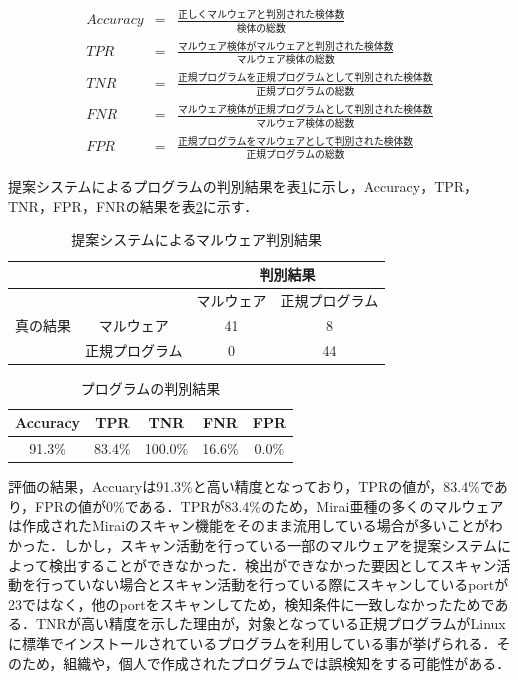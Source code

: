 \begin{eqnarray}
    Accuracy & = & \frac{正しくマルウェアと判別された検体数}{検体の総数}\\
    TPR & = & \frac{マルウェア検体がマルウェアと判別された検体数}{マルウェア検体の総数}\\
    TNR & = & \frac{正規プログラムを正規プログラムとして判別された検体数}{正規プログラムの総数}\\
    FNR & = & \frac{マルウェア検体が正規プログラムとして判別された検体数}{マルウェア検体の総数}\\ 
    FPR & = & \frac{正規プログラムをマルウェアとして判別された検体数}{正規プログラムの総数}
\end{eqnarray}

提案システムによるプログラムの判別結果を表\ref{tab:detect}に示し，Accuracy，TPR，TNR，FPR，FNRの結果を表\ref{tab:result}に示す．

\begin{table}[h]
    \centering
    \caption{提案システムによるマルウェア判別結果}
    \label{tab:detect}
\begin{tabular}[t]{|l|c|c|c|}
    \hline
            &  &  \multicolumn{2}{c|}{判別結果}  \\ \hline 
            &  &  マルウェア & 正規プログラム \\ \hline 
       真の結果 & マルウェア & 41 & 8 \\ \hline
            & 正規プログラム & 0 & 44 \\ \hline
\end{tabular}
\end{table}

\begin{table}[h]
     \caption{プログラムの判別結果} 
     \label{tab:result}
     \centering 
    \begin{tabular}{|c|c|c|c|c|} \hline 
    Accuracy & TPR    & TNR     & FNR    & FPR   \\ \hline
    91.3\%   & 83.4\% & 100.0\% & 16.6\% & 0.0\% \\ \hline
    \end{tabular}
\end{table}

評価の結果，Accuaryは91.3\%と高い精度となっており，TPRの値が，83.4\%であり，FPRの値が0\%である．TPRが83.4\%のため，Mirai亜種の多くのマルウェアは作成されたMiraiのスキャン機能をそのまま流用している場合が多いことがわかった．しかし，スキャン活動を行っている一部のマルウェアを提案システムによって検出することができなかった．検出ができなかった要因としてスキャン活動を行っていない場合とスキャン活動を行っている際にスキャンしているportが23ではなく，他のportをスキャンしてため，検知条件に一致しなかったためである．TNRが高い精度を示した理由が，対象となっている正規プログラムがLinuxに標準でインストールされているプログラムを利用している事が挙げられる．そのため，組織や，個人で作成されたプログラムでは誤検知をする可能性がある．